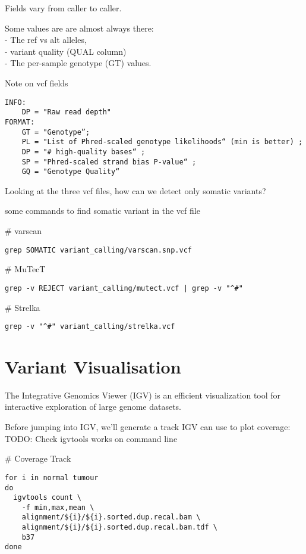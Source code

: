Fields vary from caller to caller.
 
Some values are are almost always there: \\
   - The ref vs alt alleles, \\
   - variant quality (QUAL column) \\
   - The per-sample genotype (GT) values.

Note on vcf fields
\begin{verbatim}
INFO: 
	DP = "Raw read depth"
FORMAT:
	GT = "Genotype”; 
	PL = "List of Phred-scaled genotype likelihoods“ (min is better) ; 
	DP = "# high-quality bases“ ; 
	SP = "Phred-scaled strand bias P-value“ ; 
	GQ = "Genotype Quality“
\end{verbatim}

\begin{questions}
Looking at the three vcf files, how can we detect only somatic variants?
\end{questions}
\begin{answer}
some commands to find somatic variant in the vcf file

\# varscan
\begin{lstlisting}
grep SOMATIC variant_calling/varscan.snp.vcf 
\end{lstlisting}

\# MuTecT
\begin{lstlisting}
grep -v REJECT variant_calling/mutect.vcf | grep -v "^#"
\end{lstlisting}

\# Strelka
\begin{lstlisting}
grep -v "^#" variant_calling/strelka.vcf
\end{lstlisting}
\end{answer}


\newpage

\section{Variant Visualisation}

The Integrative Genomics Viewer (IGV) is an efficient visualization tool for interactive exploration of large genome datasets. 

Before jumping into IGV, we'll generate a track IGV can use to plot coverage:
TODO: Check igvtools works on command line

\# Coverage Track
\begin{lstlisting}
for i in normal tumour
do
  igvtools count \
    -f min,max,mean \
    alignment/${i}/${i}.sorted.dup.recal.bam \
    alignment/${i}/${i}.sorted.dup.recal.bam.tdf \
    b37
done
\end{lstlisting}

